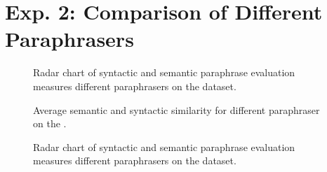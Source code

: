 \section{Exp. 2: Comparison of Different Paraphrasers}
\label{sec:app_paraphrases}

\begin{figure}[H]
    \centering
    
    \caption[Paraphrase evaluation radar chart on the \dataBlog{} dataset.]{Radar chart of syntactic and semantic paraphrase evaluation measures different paraphrasers on the \dataBlog{} dataset.}
    \label{fig:radar_blog}
\end{figure}


\begin{figure}[H]
    \centering
    
    \caption[Comparison of paraphrasers on the \dataGutenberg{} dataset.]{Average semantic and syntactic similarity for different paraphraser on the \dataGutenberg{}.}
    \label{fig:sem_syn_gutenberg}
\end{figure}

\begin{figure}[H]
    \centering
    
    \caption[Paraphrase evaluation radar chart on the \dataGutenberg{} dataset.]{Radar chart of syntactic and semantic paraphrase evaluation measures different paraphrasers on the \dataGutenberg{} dataset.}
    \label{fig:radar_gutenberg}
\end{figure}
